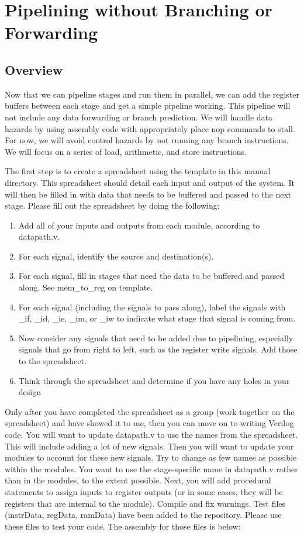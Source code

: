 \chapter{Pipelining without Branching or Forwarding}


\section{Overview}
Now that we can pipeline stages and run them in parallel, we can add the register buffers between each stage and get a simple pipeline working.  This pipeline will not include any data forwarding or branch prediction.  We will handle data hazards by using assembly code with appropriately place nop commands to stall.  For now, we will avoid control hazards by not running any branch instructions.  We will focus on a series of load, arithmetic, and store instructions.

The first step is to create a spreadsheet using the template in this manual directory.  This spreadsheet should detail each input and output of the system.  It will then be filled in with data that needs to be buffered and passed to the next stage.  Please fill out the spreadsheet by doing the following:
\begin{enumerate}
	\item Add all of your inputs and outputs from each module, according to datapath.v.
	\item For each signal, identify the source and destination(s).
	\item For each signal, fill in stages that need the data to be buffered and passed along.  See mem\_to\_reg on template.
	\item For each signal (including the signals to pass along), label the signals with \_if, \_id, \_ie, \_im, or \_iw to indicate what stage that signal is coming from.
	\item Now consider any signals that need to be added due to pipelining, especially signals that go from right to left, such as the register write signals.  Add those to the spreadsheet.
	\item Think through the spreadsheet and determine if you have any holes in your design
\end{enumerate}  

Only after you have completed the spreadsheet as a group (work together on the spreadsheet) and have showed it to me, then you can move on to writing Verilog code.  You will want to update datapath.v to use the names from the spreadsheet.  This will include adding a lot of new signals.  Then you will want to update your modules to account for these new signals.  Try to change as few names as possible within the modules.  You want to use the stage-specific name in datapath.v rather than in the modules, to the extent possible.  Next, you will add procedural statements to assign inputs to register outputs (or in some cases, they will be registers that are internal to the module).  Compile and fix warnings.  Test files (instrData, regData, ramData) have been added to the repository.  Please use these files to test your code.  The assembly for those files is below:

